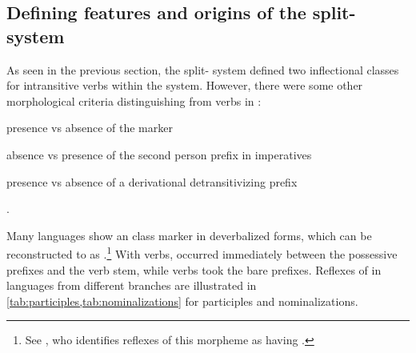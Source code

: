 \subsection{Defining features and origins of the split- system}
\label{sec:split}
As seen in the previous section, the split- system defined two inflectional classes for intransitive verbs within the \setone system.
%
%
However, there were some other morphological criteria distinguishing  from  verbs in \PC:
\begin{inlinelist}
\item presence vs absence of the  marker 
\item absence vs presence of the second person prefix  in imperatives
\item presence vs absence of a derivational detransitivizing prefix
\end{inlinelist}.

Many languages show an  class marker in deverbalized forms, which can be reconstructed to \PC as .\footnote{See \textcite[227]{meira2000split}, who identifies reflexes of this morpheme as having .}
With  verbs,  occurred immediately between the possessive prefixes and the verb stem, while  verbs took the bare prefixes.
Reflexes of  in languages from different branches are illustrated in \cref{tab:participles,tab:nominalizations} for participles and nominalizations.


